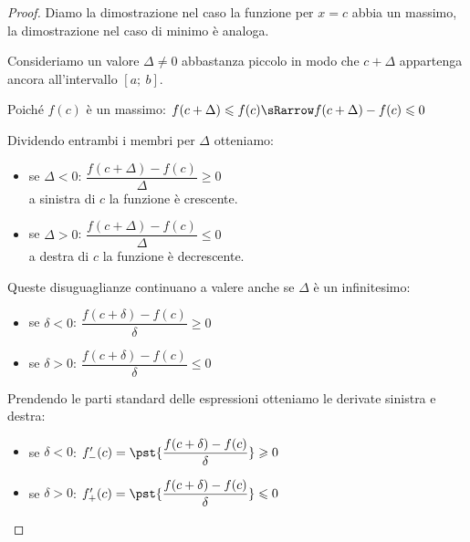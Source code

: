 \begin{proof}
Diamo la dimostrazione nel caso la funzione per \(x = c\) abbia un massimo, 
la dimostrazione nel caso di minimo è analoga.

Consideriamo un valore \(\Delta \neq 0\) abbastanza piccolo 
in modo che \(c+\Delta\) appartenga ancora all'intervallo \([a;~b]\).

Poiché \(f(c)\) è un massimo: \quad 
\(f(c+\Delta) \leqslant f(c) \sRarrow f(c+\Delta) - f(c) \leqslant 0\)

Dividendo entrambi i membri per \(\Delta\) otteniamo:
\begin{multicols}{2}
\begin{itemize} [nosep]
\item se \(\Delta < 0\): \quad 
\(\dfrac{f(c+\Delta) - f(c)}{\Delta} \geqslant 0\) \\
a sinistra di \(c\) la funzione è crescente.
\item se \(\Delta > 0\): \quad 
\(\dfrac{f(c+\Delta) - f(c)}{\Delta} \leqslant 0\) \\
a destra di \(c\) la funzione è decrescente.
\end{itemize}
\end{multicols}

Queste disuguaglianze continuano a valere anche se \(\Delta\) è un 
infinitesimo:
\begin{multicols}{2}
\begin{itemize} [nosep]
\item se \(\delta < 0\): \quad 
\(\dfrac{f(c+\delta) - f(c)}{\delta} \geqslant 0\)
\item se \(\delta > 0\): \quad 
\(\dfrac{f(c+\delta) - f(c)}{\delta} \leqslant 0\)
\end{itemize}
\end{multicols}

Prendendo le parti standard delle espressioni otteniamo le derivate 
sinistra e destra:
\begin{itemize} [nosep]
\item se \(\delta < 0\): \quad 
\(f'_-(c)=\pst{\dfrac{f(c+\delta) - f(c)}{\delta}} \geqslant 0\)
\item se \(\delta > 0\): \quad 
\(f'_+(c)=\pst{\dfrac{f(c+\delta) - f(c)}{\delta}} \leqslant 0\)
\end{itemize}



\end{proof}

